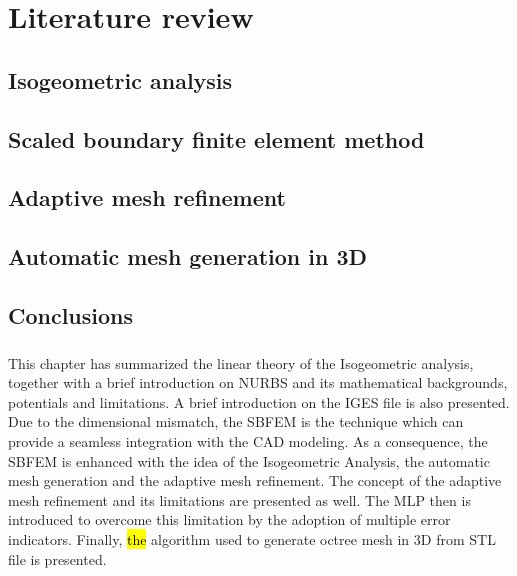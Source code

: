 
\chapter{Literature review}
% 

\section{Isogeometric analysis}
\label{lr_sec:iso_analysis}




\section{Scaled boundary finite element method}
\label{lr_sec:sbfem}


\section{Adaptive mesh refinement}



\section{Automatic mesh generation in 3D}


\section{Conclusions}
\paragraph{}
This chapter has summarized the linear theory of the Isogeometric analysis, together with a brief introduction on NURBS and its mathematical backgrounds, potentials and limitations.
A brief introduction on the IGES file is also presented.
Due to the dimensional mismatch, the SBFEM is the technique which can provide a seamless integration with the CAD modeling.
As a consequence, the SBFEM is enhanced with the idea of the Isogeometric Analysis, the automatic mesh generation and the adaptive mesh refinement.
The concept of the adaptive mesh refinement and its limitations are presented as well.
The MLP then is introduced to overcome this limitation by the adoption of multiple error indicators.
Finally, \hl{the} algorithm used to generate octree mesh in 3D from STL file is presented.
